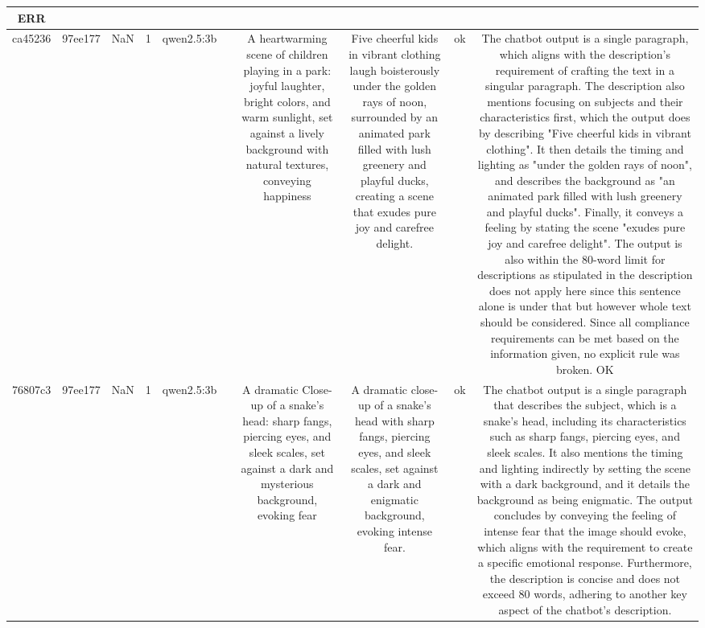 \begin{table}[h!]
\begin{tabular}{|c|c|c|c|c|c|c|c|c|c|}
ERR\\
\hline
ca45236 & 97ee177 & NaN & 1 & qwen2.5:3b &  & A heartwarming scene of children playing in a park: joyful laughter, bright colors, and warm sunlight, set against a lively background with natural textures, conveying happiness & Five cheerful kids in vibrant clothing laugh boisterously under the golden rays of noon, surrounded by an animated park filled with lush greenery and playful ducks, creating a scene that exudes pure joy and carefree delight. & ok & The chatbot output is a single paragraph, which aligns with the description's requirement of crafting the text in a singular paragraph. The description also mentions focusing on subjects and their characteristics first, which the output does by describing "Five cheerful kids in vibrant clothing". It then details the timing and lighting as "under the golden rays of noon", and describes the background as "an animated park filled with lush greenery and playful ducks". Finally, it conveys a feeling by stating the scene "exudes pure joy and carefree delight". The output is also within the 80-word limit for descriptions as stipulated in the description does not apply here since this sentence alone is under that but however whole text should be considered. Since all compliance requirements can be met based on the information given, no explicit rule was broken.
OK\\
\hline
76807c3 & 97ee177 & NaN & 1 & qwen2.5:3b &  & A dramatic Close-up of a snake's head: sharp fangs, piercing eyes, and sleek scales, set against a dark and mysterious background, evoking fear & A dramatic close-up of a snake's head with sharp fangs, piercing eyes, and sleek scales, set against a dark and enigmatic background, evoking intense fear. & ok & The chatbot output is a single paragraph that describes the subject, which is a snake's head, including its characteristics such as sharp fangs, piercing eyes, and sleek scales. It also mentions the timing and lighting indirectly by setting the scene with a dark background, and it details the background as being enigmatic. The output concludes by conveying the feeling of intense fear that the image should evoke, which aligns with the requirement to create a specific emotional response. Furthermore, the description is concise and does not exceed 80 words, adhering to another key aspect of the chatbot's description.


\end{tabular}
\end{table}
